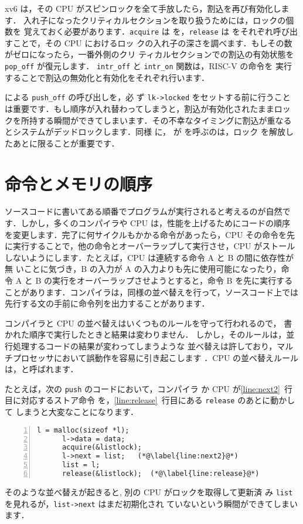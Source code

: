 xv6 は，その CPU がスピンロックを全て手放したら，割込を再び有効化します．
入れ子になったクリティカルセクションを取り扱うためには，ロックの個数を
覚えておく必要があります．\lstinline{acquire} は 
を，\lstinline{release} は 
をそれぞれ呼び出すことで，その CPU におけるロッ
クの入れ子の深さを調べます．もしその数がゼロになったら，一番外側のクリ
ティカルセクションでの割込の有効状態を \lstinline{pop_off} が復元します．
\lstinline{intr_off} と \lstinline{intr_on} 関数は，RISC-V の命令を
実行することで割込の無効化と有効化をそれぞれ行います．

 による \texttt{push\_off} の呼び出しを，必
ず \texttt{lk->locked} 
をセットする前に行うこと
は重要です．もし順序が入れ替わってしまうと，割込が有効化されたままロッ
クを所持する瞬間ができてしまいます．その不幸なタイミングに割込が重なる
とシステムがデッドロックします．同様
に， が  を呼ぶのは，ロック
を解放したあとに限ることが重要です．

\section{命令とメモリの順序}

ソースコードに書いてある順番でプログラムが実行されると考えるのが自然で
す．しかし，多くのコンパイラや CPU は，性能を上げるためにコードの順序
を変更します．完了に何サイクルもかかる命令があったら，CPU その命令を先
に実行することで，他の命令とオーバーラップして実行させ，CPU がストール
しないようにします．たとえば，CPU は連続する命令 A と B の間に依存性が無
いことに気づき，B の入力が A の入力よりも先に使用可能になったり，命
令 A と B の実行をオーバーラップさせようとすると，命令 B を先に実行する
ことがあります．コンパイラは，同様の並べ替えを行って，ソースコード上では
先行する文の手前に命令列を出力することがあります．

コンパイラと CPU の並べ替えはいくつものルールを守って行われるので，
書かれた順序で実行したときと結果は変わりません．
しかし，そのルールは，並行処理するコードの結果が変わってしまうような
並べ替えは許しており，マルチプロセッサにおいて誤動作を容易に引き起こします
\cite{riscv:user,boehm04}．CPU の並べ替えルールは，と呼ばれます．

たとえば，次の \lstinline{push} のコードにおいて，コンパイラ
か CPU が\ref{line:next2}~行目に対応するストア命令
を，\ref{line:release}~行目にある \lstinline{release} のあとに動かして
しまうと大変なことになります．
%
\begin{lstlisting}[numbers=left,firstnumber=1]
      l = malloc(sizeof *l);
      l->data = data;
      acquire(&listlock);
      l->next = list;   (*@\label{line:next2}@*)
      list = l;      
      release(&listlock);  (*@\label{line:release}@*)
\end{lstlisting}
%
そのような並べ替えが起きると, 別の CPU がロックを取得して更新済
み \lstinline{list} を見れるが，\lstinline{list->next} はまだ初期化され
ていないという瞬間ができてしまいます．


